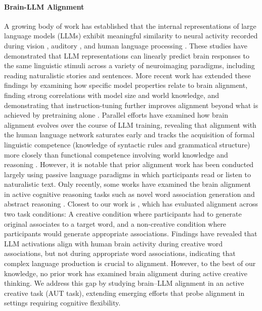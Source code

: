 \paragraph{Brain-LLM Alignment} 
A growing body of work has established that the internal representations of large language models (LLMs) exhibit meaningful similarity to neural activity recorded during vision \citep{yamins2014performance, khaligh2014deep, cichy2016comparison, gokce2024scaling}, auditory \citep{koumura2023human, kell2018task, tuckute2023many}, and human language processing \citep{schrimpf2021neural, goldstein2022shared, caucheteux2022brains, tuckute2024driving}. These studies have demonstrated that LLM representations can linearly predict brain responses to the same linguistic stimuli across a variety of neuroimaging paradigms, including reading naturalistic stories and sentences. More recent work has extended these findings by examining how specific model properties relate to brain alignment, finding strong correlations with model size and world knowledge, and demonstrating that instruction-tuning further improves alignment beyond what is achieved by pretraining alone \citep{aw2023instruction}. Parallel efforts have examined how brain alignment evolves over the course of LLM training, revealing that alignment with the human language network saturates early and tracks the acquisition of formal linguistic competence (knowledge of syntactic rules and grammatical structure) more closely than functional competence involving world knowledge and reasoning \citep{alkhamissi2025language}. However, it is notable that prior alignment work has been conducted largely using passive language paradigms in which participants read or listen to naturalistic text. Only recently, some works have examined the brain alignment in active cognitive reasoning tasks such as novel word association generation \citep{kwon2024assessing} and abstract reasoning \citep{pinier2025large}. Closest to our work is \citet{kwon2024assessing}, which has evaluated alignment across two task conditions: A creative condition where participants had to generate original associates to a target word, and a non-creative condition where participants would generate appropriate associations. Findings have revealed that LLM activations align with human brain activity during creative word associations, but not during appropriate word associations, indicating that complex language production is crucial to alignment. However, to the best of our knowledge, no prior work has examined brain alignment during active creative thinking. We address this gap by studying brain–LLM alignment in an active creative task (AUT task), extending emerging efforts that probe alignment in settings requiring cognitive flexibility.

